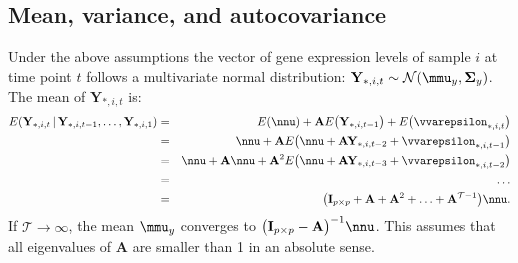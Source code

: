 \documentclass[a4paper]{article}
\theoremstyle{myexamplestyle}
\begin{document}
\subsection{Mean, variance, and autocovariance}
Under the above assumptions the vector of gene expression levels of sample $i$ at time point $t$ follows a multivariate normal distribution: $\mathbf{Y}_{\ast, i,t} \sim \mathcal{N}(\mmu_y, \mathbf{\Sigma}_{y})$. The mean of $\mathbf{Y}_{\ast,i,t}$ is:
\begin{eqnarray*}
E(\mathbf{Y}_{\ast,i,t} \, | \, \mathbf{Y}_{\ast,i,t-1}, \ldots,  \mathbf{Y}_{\ast,i,1}) & = & E(\nnu) + \mathbf{A} E\big( \mathbf{Y}_{\ast,i,t-1}\big) + E\big(\vvarepsilon_{\ast,i,t}\big)
\\
& = & \nnu + \mathbf{A}  E\big( \nnu + \mathbf{A} \mathbf{Y}_{\ast,i,t-2}  + \vvarepsilon_{\ast,i,t-1} \big)
\\
& = & \nnu + \mathbf{A} \nnu + \mathbf{A}^2 E\big( \nnu + \mathbf{A} \mathbf{Y}_{\ast,i,t-3}  + \vvarepsilon_{\ast,i,t-2}  \big)
\\
& = & \ldots
\\
& = & \big( \mathbf{I}_{p \times p} + \mathbf{A} + \mathbf{A}^2 + \ldots + \mathbf{A}^{\mathcal{T}-1} \big) \nnu.
\end{eqnarray*}
If $\mathcal{T} \rightarrow \infty$, the mean $\mmu_y$ converges to $\big( \mathbf{I}_{p \times p} - \mathbf{A}\big)^{-1} \nnu$. This assumes that all eigenvalues of $\mathbf{A}$ are smaller than 1 in an absolute sense.
\end{document}
